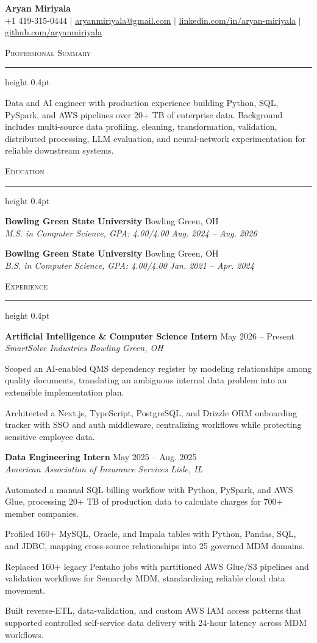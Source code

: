 \documentclass[letterpaper,11pt]{article}
\newcommand{\resumesection}[1]{%
  \par\vspace{2pt}%
  {\large\scshape #1}\par\vspace{2pt}%
  \hrule height 0.4pt\vspace{2pt}%
}
\newcommand{\resumeSubheading}[4]{
  \textbf{#1} \hfill #2\\
  \textit{#3} \hfill \textit{#4}
}
\begin{document}
\begin{center}
  {\LARGE \textbf{Aryan Miriyala}}\\[-1pt]
  \small
  +1 419-315-0444 $|$
  \href{mailto:aryanmiriyala@gmail.com}{aryanmiriyala@gmail.com} $|$
  \href{https://www.linkedin.com/in/aryan-miriyala-7788a21b6/}{linkedin.com/in/aryan-miriyala} $|$
  \href{https://github.com/aryanmiriyala}{github.com/aryanmiriyala}
\end{center}\vspace{-10pt}

\resumesection{Professional Summary}
Data and AI engineer with production experience building Python, SQL, PySpark, and AWS pipelines over 20+ TB of enterprise data. Background includes multi-source data profiling, cleaning, transformation, validation, distributed processing, LLM evaluation, and neural-network experimentation for reliable downstream systems.

\resumesection{Education}
\resumeSubheading
{Bowling Green State University}{Bowling Green, OH}
{M.S. in Computer Science, GPA: 4.00/4.00}{Aug. 2024 -- Aug. 2026}

\resumeSubheading
{Bowling Green State University}{Bowling Green, OH}
{B.S. in Computer Science, GPA: 4.00/4.00}{Jan. 2021 -- Apr. 2024}

\resumesection{Experience}
\resumeSubheading
{Artificial Intelligence \& Computer Science Intern}{May 2026 -- Present}
{SmartSolve Industries}{Bowling Green, OH}
\begin{tightitemize}
  \item Scoped an AI-enabled QMS dependency register by modeling relationships among quality documents, translating an ambiguous internal data problem into an extensible implementation plan.
  \item Architected a Next.js, TypeScript, PostgreSQL, and Drizzle ORM onboarding tracker with SSO and auth middleware, centralizing workflows while protecting sensitive employee data.
\end{tightitemize}

\resumeSubheading
{Data Engineering Intern}{May 2025 -- Aug. 2025}
{American Association of Insurance Services}{Lisle, IL}
\begin{tightitemize}
  \item Automated a manual SQL billing workflow with Python, PySpark, and AWS Glue, processing 20+ TB of production data to calculate charges for 700+ member companies.
  \item Profiled 160+ MySQL, Oracle, and Impala tables with Python, Pandas, SQL, and JDBC, mapping cross-source relationships into 25 governed MDM domains.
  \item Replaced 160+ legacy Pentaho jobs with partitioned AWS Glue/S3 pipelines and validation workflows for Semarchy MDM, standardizing reliable cloud data movement.
  \item Built reverse-ETL, data-validation, and custom AWS IAM access patterns that supported controlled self-service data delivery with 24-hour latency across MDM workflows.
\end{tightitemize}
\end{document}
